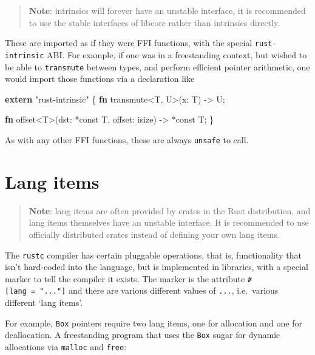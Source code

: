 \documentclass[a4paper,]{book}
\newenvironment{Shaded}{\begin{snugshade}}{\end{snugshade}}
\newcommand{\KeywordTok}[1]{\textcolor[rgb]{0.13,0.29,0.53}{\textbf{{#1}}}}
\newcommand{\StringTok}[1]{\textcolor[rgb]{0.31,0.60,0.02}{{#1}}}
\newcommand{\NormalTok}[1]{{#1}}
\begin{document}
\begin{quote}
\textbf{Note}: intrinsics will forever have an unstable interface, it is
recommended to use the stable interfaces of libcore rather than
intrinsics directly.
\end{quote}

These are imported as if they were FFI functions, with the special
\texttt{rust-intrinsic} ABI. For example, if one was in a freestanding
context, but wished to be able to \texttt{transmute} between types, and
perform efficient pointer arithmetic, one would import those functions
via a declaration like

\begin{Shaded}
\begin{Highlighting}[]

\KeywordTok{extern} \StringTok{"rust-intrinsic"} \NormalTok{\{}
    \KeywordTok{fn} \NormalTok{transmute<T, U>(x: T) -> U;}

    \KeywordTok{fn} \NormalTok{offset<T>(dst: *const T, offset: isize) -> *const T;}
\NormalTok{\}}
\end{Highlighting}
\end{Shaded}

As with any other FFI functions, these are always \texttt{unsafe} to
call.

\section{Lang items}\label{sec--lang-items}

\begin{quote}
\textbf{Note}: lang items are often provided by crates in the Rust
distribution, and lang items themselves have an unstable interface. It
is recommended to use officially distributed crates instead of defining
your own lang items.
\end{quote}

The \texttt{rustc} compiler has certain pluggable operations, that is,
functionality that isn't hard-coded into the language, but is
implemented in libraries, with a special marker to tell the compiler it
exists. The marker is the attribute \texttt{\#{[}lang\ =\ "..."{]}} and
there are various different values of \texttt{...}, i.e.~various
different `lang items'.

For example, \texttt{Box} pointers require two lang items, one for
allocation and one for deallocation. A freestanding program that uses
the \texttt{Box} sugar for dynamic allocations via \texttt{malloc} and
\texttt{free}:
\end{document}
